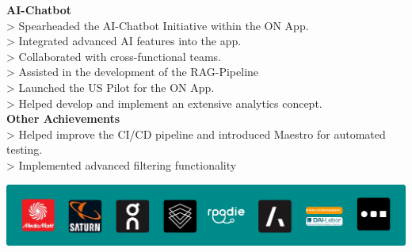 \documentclass[10pt,a4paper,normalphoto]{altacv}
\begin{document}
\vspace{2em}



\textbf{AI-Chatbot}\\
> Spearheaded the AI-Chatbot Initiative within the ON App.\\
> Integrated advanced AI features into the app.\\
> Collaborated with cross-functional teams.\\
> Assisted in the development of the RAG-Pipeline \\
> Launched the US Pilot for the ON App.\\
> Helped develop and implement an extensive analytics concept.\\

\vspace{.5em}
\textbf{Other Achievements}\\
> Helped improve the CI/CD pipeline and introduced Maestro for automated testing.\\
> Implemented advanced filtering functionality 

\vspace{1em}


\vspace{2em}

\begin{center}
  \includegraphics[width=0.905\paperwidth]{company-logos-with-background.png}
\end{center}
\end{document}
